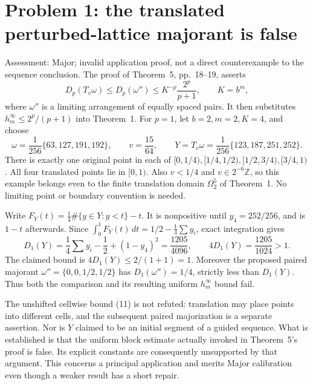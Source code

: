 \documentclass[10pt]{article}
\begin{document}
\section*{Problem 1: the translated perturbed-lattice majorant is false}
Assessment: Major; invalid application proof, not a direct counterexample to the sequence conclusion. The proof of Theorem 5, pp. 18–19, asserts \[D_p(T_v\omega)\le D_p(\omega'')
       \le K^{-p}\frac{2^p}{p+1},\qquad K=b^m,\] where \(\omega''\) is a limiting arrangement of equally spaced pairs. It then substitutes \(h_m^\infty\le2^p/(p+1)\) into Theorem 1. For \(p=1\), let \(b=2,m=2,K=4\), and choose \[\omega=\frac1{256}\{63,127,191,192\},\qquad
 v=\frac{15}{64},\qquad
 Y=T_v\omega=\frac1{256}\{123,187,251,252\}.\] There is exactly one original point in each of \([0,1/4),[1/4,1/2),[1/2,3/4),[3/4,1)\). All four translated points lie in \([0,1)\). Also \(v<1/4\) and \(v\in2^{-6}\mathbb Z\), so this example belongs even to the finite translation domain \(\Omega_2^5\) of Theorem 1. No limiting point or boundary convention is needed.\par
Write \(F_Y(t)=\frac14\#\{y\in Y:y<t\}-t\). It is nonpositive until \(y_4=252/256\), and is \(1-t\) afterwards. Since \(\int_0^1F_Y(t)\,dt=1/2-\frac14\sum y_i\), exact integration gives \[D_1(Y)=\frac14\sum y_i-\frac12+(1-y_4)^2
       =\frac{1205}{4096},
 \qquad 4D_1(Y)=\frac{1205}{1024}>1.\] The claimed bound is \(4D_1(Y)\le2/(1+1)=1\). Moreover the proposed paired majorant \(\omega''=\{0,0,1/2,1/2\}\) has \(D_1(\omega'')=1/4\), strictly less than \(D_1(Y)\). Thus both the comparison and its resulting uniform \(h_m^\infty\) bound fail.\par
The unshifted cellwise bound (11) is not refuted: translation may place points into different cells, and the subsequent paired majorization is a separate assertion. Nor is \(Y\) claimed to be an initial segment of a guided sequence. What is established is that the uniform block estimate actually invoked in Theorem 5’s proof is false. Its explicit constants are consequently unsupported by that argument. This concerns a principal application and merits Major calibration even though a weaker result has a short repair.\par
\end{document}
